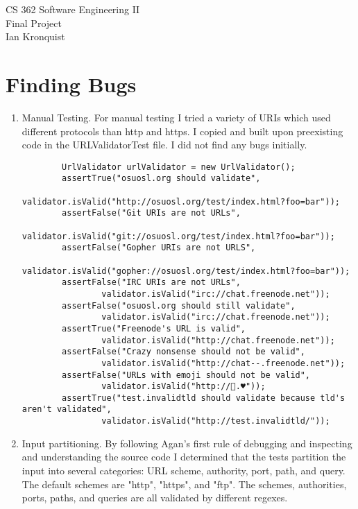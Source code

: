 \documentclass[12pt,letterpaper]{article}
\begin{document}
\begin{titlepage}
    \vspace*{4cm}
    \begin{flushright}
    {\huge
        CS 362 Software Engineering II\\[1cm]
        Final Project\\[1cm]
    }
    \bigskip
    Ian Kronquist
    \vfill
    \end{flushright}
\end{titlepage}

\bigskip
\section{Finding Bugs}
\begin{enumerate}
    \item Manual Testing. For manual testing I tried a variety of URIs which used different protocols than http and https. I copied and built upon preexisting code in the URLValidatorTest file. I did not find any bugs initially.
    \begin{verbatim}
        UrlValidator urlValidator = new UrlValidator();
        assertTrue("osuosl.org should validate",
                validator.isValid("http://osuosl.org/test/index.html?foo=bar"));
        assertFalse("Git URIs are not URLs",
                validator.isValid("git://osuosl.org/test/index.html?foo=bar"));
        assertFalse("Gopher URIs are not URLS",
                validator.isValid("gopher://osuosl.org/test/index.html?foo=bar"));
        assertFalse("IRC URIs are not URLs",
                validator.isValid("irc://chat.freenode.net"));
        assertFalse("osuosl.org should still validate",
                validator.isValid("irc://chat.freenode.net"));
        assertTrue("Freenode's URL is valid",
                validator.isValid("http://chat.freenode.net"));
        assertFalse("Crazy nonsense should not be valid",
                validator.isValid("http://chat--.freenode.net"));
        assertFalse("URLs with emoji should not be valid",
                validator.isValid("http://🚀.♥︎"));
        assertTrue("test.invalidtld should validate because tld's aren't validated",
                validator.isValid("http://test.invalidtld/"));
    \end{verbatim}
    \item Input partitioning. By following Agan's first rule of debugging and inspecting and understanding the source code I determined that the tests partition the input into several categories: URL scheme, authority, port, path, and query. The default schemes are "http", "https", and "ftp". The schemes, authorities, ports, paths, and queries are all validated by different regexes.

\end{enumerate}
\end{document}

